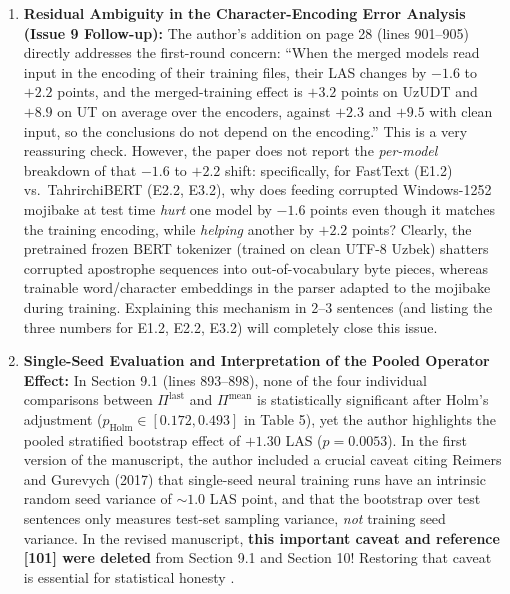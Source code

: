 \documentclass[11pt,a4paper]{article}
\begin{document}
\begin{enumerate}[label=\textbf{Issue \arabic*:}, resume, wide, labelwidth=!, labelindent=0pt]
    \item \textbf{Residual Ambiguity in the Character-Encoding Error Analysis (Issue 9 Follow-up):}
    The author's addition on page 28 (lines 901--905) directly addresses the first-round concern: ``When the merged models read input in the encoding of their training files, their LAS changes by $-1.6$ to $+2.2$ points, and the merged-training effect is $+3.2$ points on UzUDT and $+8.9$ on UT on average over the encoders, against $+2.3$ and $+9.5$ with clean input, so the conclusions do not depend on the encoding.'' This is a very reassuring check. However, the paper does not report the \emph{per-model} breakdown of that $-1.6$ to $+2.2$ shift: specifically, for FastText (E1.2) vs.\ TahrirchiBERT (E2.2, E3.2), why does feeding corrupted Windows-1252 mojibake at test time \emph{hurt} one model by $-1.6$ points even though it matches the training encoding, while \emph{helping} another by $+2.2$ points? Clearly, the pretrained frozen BERT tokenizer (trained on clean UTF-8 Uzbek) shatters corrupted apostrophe sequences into out-of-vocabulary byte pieces, whereas trainable word/character embeddings in the parser adapted to the mojibake during training. Explaining this mechanism in 2--3 sentences (and listing the three numbers for E1.2, E2.2, E3.2) will completely close this issue.

    \item \textbf{Single-Seed Evaluation and Interpretation of the Pooled Operator Effect:}
    In Section 9.1 (lines 893--898), none of the four individual comparisons between $\Pi^{\mathrm{last}}$ and $\Pi^{\mathrm{mean}}$ is statistically significant after Holm's adjustment ($p_{\mathrm{Holm}} \in [0.172, 0.493]$ in Table 5), yet the author highlights the pooled stratified bootstrap effect of $+1.30$ LAS ($p = 0.0053$). In the first version of the manuscript, the author included a crucial caveat citing Reimers and Gurevych (2017) that single-seed neural training runs have an intrinsic random seed variance of $\sim 1.0$ LAS point, and that the bootstrap over test sentences only measures test-set sampling variance, \emph{not} training seed variance. In the revised manuscript, \textbf{this important caveat and reference [101] were deleted} from Section 9.1 and Section 10! Restoring that caveat is essential for statistical honesty \cite{Reimers2017}.


\end{enumerate}
\end{document}
